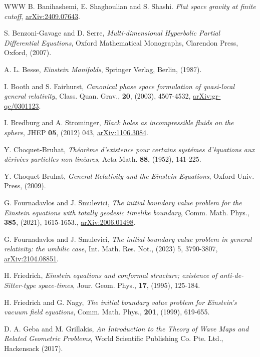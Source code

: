 \documentclass[10pt]{amsart}
\newcommand{\<}{\langle}
\renewcommand{\>}{\rangle}
\theoremstyle{plain}
\theoremstyle{remark}
\theoremstyle{definition}
\numberwithin{equation}{section}
\begin{document}
\begin{thebibliography}{WWW}
 B. Banihashemi, E. Shaghoulian and S. Shashi. {\it Flat space gravity at finite cutoff}, 
\href{https://arXiv.org/abs/2409.07643}{arXiv:2409.07643}. 

 S. Benzoni-Gavage and D. Serre, {\it Multi-dimensional Hyperbolic Partial Differential Equations}, Oxford 
Mathematical Monographs, Clarendon Press, Oxford, (2007).  

 A. L. Besse, {\it Einstein Manifolds}, Springer Verlag, Berlin, (1987). 

 I. Booth and S. Fairhurst, {\it Canonical phase space formulation of quasi-local general relativity},  
Class. Quan. Grav., {\bf 20}, (2003), 4507-4532,  \href{https://arXiv.org/abs/gr-qc/0301123}{arXiv:gr-qc/0301123}. 

 I. Bredburg and A. Strominger, {\it Black holes as incompressible fluids on the sphere}, 
JHEP {\bf 05}, (2012) 043, \href{https://arXiv.org/abs/1106.3084}{arXiv:1106.3084}. 

 Y. Choquet-Bruhat, {\it Th\'eor\`eme d'existence pour certains syst\'emes d'\`equations aux d\`eriv\`ees partielles 
non lin\`eares}, Acta Math. {\bf 88}, (1952), 141-225. 

 Y. Choquet-Bruhat, {\it General Relativity and the Einstein Equations}, Oxford Univ. Press, (2009). 

 G. Fournadavlos and J. Smulevici, {\it The initial boundary value problem for the Einstein equations with totally geodesic 
timelike boundary}, Comm. Math. Phys., {\bf 385}, (2021), 1615-1653., \href{https://arXiv.org/abs/2006.01498}{arXiv:2006.01498}. 

 G. Fournadavlos and J. Smulevici, {\it The initial boundary value problem in general relativity: the umbilic case},  
Int. Math. Res. Not., (2023) 5, 3790-3807, \href{https://arXiv.org/abs/2104.08851}{arXiv:2104.08851}. 

 H. Friedrich, {\it Einstein equations and conformal structure; existence of anti-de-Sitter-type space-times}, 
Jour. Geom. Phys., {\bf 17}, (1995), 125-184. 

 H. Friedrich and G. Nagy, {\it The initial boundary value problem for Einstein's vacuum field equations}, 
Comm. Math. Phys., {\bf 201}, (1999), 619-655. 

 D. A. Geba and M. Grillakis, {\it An Introduction to the Theory of Wave Maps and Related Geometric Problems}, 
World Scientific Publishing Co. Pte. Ltd., Hackensack (2017).


\end{thebibliography}
\end{document}
